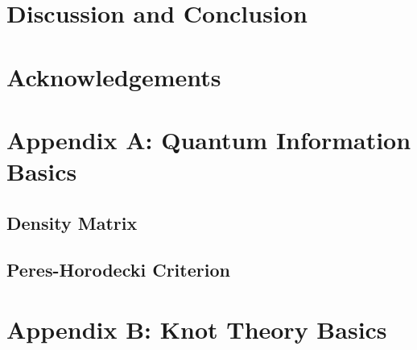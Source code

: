 \documentclass{scrartcl}
\begin{document}
\section{Discussion and Conclusion}
\section{Acknowledgements}
\newpage
\section*{Appendix A: {\huge Quantum Information Basics}}
\subsection{Density Matrix}
\subsection{Peres-Horodecki Criterion}
\newpage
\section*{Appendix B: {\huge Knot Theory Basics}}
\newpage
\end{document}
